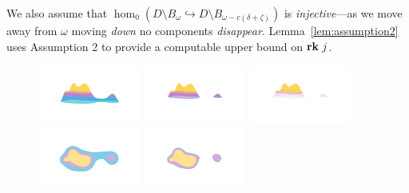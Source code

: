 We also assume that $\hom_0(D\setminus B_\omega\hookrightarrow D\setminus B_{\omega-c(\delta+\zeta)})$ is \emph{injective}---as we move away from $\omega$ moving \emph{down} no components \emph{disappear}.
Lemma~\ref{lem:assumption2} uses Assumption 2 to provide a computable upper bound on $\mathbf{rk}~j$.%

\begin{figure}[htbp]\label{fig:assumption1}
  \centering
  \includegraphics[trim=200 300 200 200, clip, width=0.3\textwidth]{scripts/figures/surf/ass2_B_side.png}
  \includegraphics[trim=200 300 200 200, clip, width=0.3\textwidth]{scripts/figures/surf/ass1_C_side.png}
  \includegraphics[trim=200 300 200 200, clip, width=0.3\textwidth]{scripts/figures/surf/ass1_D_side.png}
  \includegraphics[trim=300 100 200 200, clip, width=0.3\textwidth]{scripts/figures/surf/ass2_B_top.png}
  \includegraphics[trim=300 150 300 200, clip, width=0.3\textwidth]{scripts/figures/surf/ass1_C_top.png}

\end{figure}
